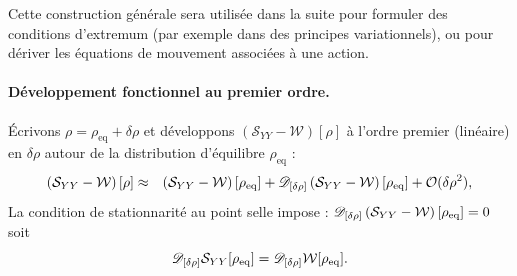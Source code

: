 {%
%
%
%

Cette construction générale sera utilisée dans la suite pour formuler des conditions d’extremum (par exemple dans des principes variationnels), ou pour dériver les équations de mouvement associées à une action.
}


\paragraph{Développement fonctionnel au premier ordre.}

Écrivons
\(
\rho=\rho_{\text{eq}}+\delta\rho
\)
et développons $(\mathcal{S}_{YY}-\mathcal{W})[\rho]$ à l’ordre premier (linéaire) en $\delta \rho$ autour de la distribution d’équilibre $\rho_{\mathrm{eq}}$ :
\begin{eqnarray*}
	\left(  \mathcal{S}_{YY} - \mathcal{W }\right )[\rho] & \approx &\left(  \mathcal{S}_{YY} - \mathcal{W}\right )[ \rho_{\mathrm{eq}}] +  \mathscr{D}_{[\delta \rho]}\left (  \mathcal{S}_{YY} - \mathcal{W}\right )[ \rho_{\mathrm{eq}}]  + \mathcal{O}(\delta \rho^2 ) ,
	\label{chap:TBA:eq:action}	
\end{eqnarray*}	
La condition de stationnarité au point selle impose :
\(
	\mathscr{D}_{[\delta \rho]}\left (  \mathcal{S}_{YY} - \mathcal{W}\right )[ \rho_{\mathrm{eq}}] 	  =  0  	
\)
soit 
\begin{equation}
	\mathscr{D}_{[\delta \rho]} \mathcal{S}_{YY}[ \rho_{\mathrm{eq}}]  = \mathscr{D}_{[\delta \rho]}\mathcal{W}[ \rho_{\mathrm{eq}}] . \label{chap:TBA:eq:stationnarite}
\end{equation}

